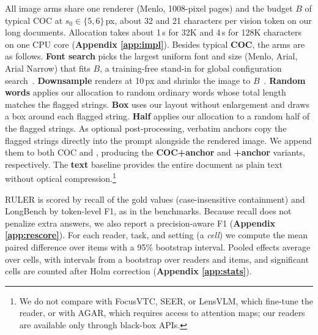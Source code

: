 All image arms share one renderer (Menlo, 1008-pixel pages) and the budget $B$ of typical COC at $s_0\in\{5,6\}$\,px, about 32 and 21 characters per vision token on our long documents.
Allocation takes about 1\,s for 32K and 4\,s for 128K characters on one CPU core (\textbf{Appendix \ref{app:impl}}).
Besides typical \textbf{COC}, the arms are as follows.
\textbf{Font search} picks the largest uniform font and size (Menlo, Arial, Arial Narrow) that fits $B$, a training-free stand-in for global configuration search~\cite{cheng2025glyph}.
\textbf{Downsample} renders at 10\,px and shrinks the image to $B$~\cite{wei2025deepseekocr}.
\textbf{Random words} applies our allocation to random ordinary words whose total length matches the flagged strings.
\textbf{Box} uses our layout without enlargement and draws a box around each flagged string.
\textbf{Half} applies our allocation to a random half of the flagged strings.
As optional post-processing, verbatim anchors copy the flagged strings directly into the prompt alongside the rendered image. We append them to both COC and \name, producing the \textbf{COC+anchor} and \textbf{\name+anchor} variants, respectively. The \textbf{text} baseline provides the entire document as plain text without optical compression.\footnote{We do not compare with FocusVTC, SEER, or LensVLM, which fine-tune the reader, or with AGAR, which requires access to attention maps; our readers are available only through black-box APIs.}

RULER is scored by recall of the gold values (case-insensitive containment) and LongBench by token-level F1, as in the benchmarks.
Because recall does not penalize extra answers, we also report a precision-aware F1 (\textbf{Appendix \ref{app:rescore}}).
For each reader, task, and setting (a \emph{cell}) we compute the mean paired difference over items with a 95\% bootstrap interval. Pooled effects average over cells, with intervals from a bootstrap over readers and items, and significant cells are counted after Holm correction (\textbf{Appendix \ref{app:stats}}).
